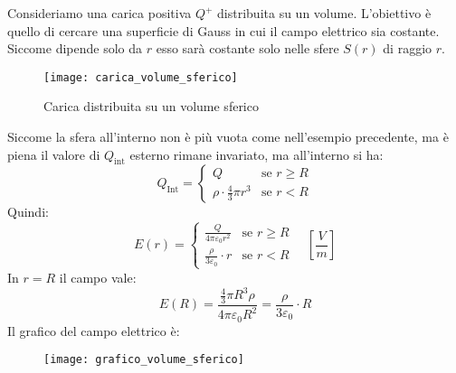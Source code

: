 \documentclass[a4paper]{article}
\begin{document}
\begin{example}
  Consideriamo una carica positiva \( Q^+ \) distribuita su un volume. L'obiettivo è
  quello di cercare una superficie di Gauss in cui il campo elettrico sia costante.
  Siccome dipende solo da \( r \) esso sarà costante solo nelle sfere \( S(r) \) di raggio
  \( r \).
  \begin{figure}[H]
    \centering
    \texttt{[image: carica\_volume\_sferico]}
    \caption{Carica distribuita su un volume sferico}
  \end{figure}
  \noindent
  Siccome la sfera all'interno non è più vuota come nell'esempio precedente, ma è piena
  il valore di \( Q_{\text{int}} \) esterno rimane invariato, ma all'interno si ha:
  \[
    Q_{\text{Int}} = 
    \begin{cases}
      Q & \text{se } r \ge R\\
      \rho \cdot \frac{4}{3} \pi r^3 & \text{se } r < R
    \end{cases}
  \] 
  Quindi:
  \[
    E(r) = \begin{cases}
      \frac{Q}{4 \pi \varepsilon_0 r^2} & \text{se } r \ge R\\
      \frac{\rho}{3 \varepsilon_0} \cdot r & \text{se } r < R
    \end{cases}
    \quad \left[ \frac{V}{m} \right]
  \]
  In \( r = R \) il campo vale:
  \[
    E(R) = \frac{\frac{4}{3} \pi R^3 \rho}{4 \pi \varepsilon_0 R^2} 
    = \frac{\rho}{3 \varepsilon_0} \cdot R
  \] 
  Il grafico del campo elettrico è:
  \begin{figure}[H]
    \centering
    \texttt{[image: grafico\_volume\_sferico]}
  \end{figure}
\end{example}
\end{document}
